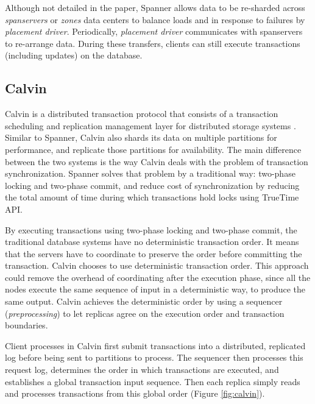 Although not detailed in the paper, Spanner allows data to be re-sharded across
\emph{spanservers} or \emph{zones} data centers to balance loads and in response
to failures by \emph{placement driver}. Periodically, \emph{placement driver}
communicates with spanservers to re-arrange data. During these transfers,
clients can still execute transactions (including updates) on the database.

\subsection{Calvin}

Calvin is a distributed transaction protocol that consists of a transaction
scheduling and replication management layer for distributed storage systems
\cite{calvin}. Similar to Spanner, Calvin also shards its data on multiple
partitions for performance, and replicate those partitions for availability. The
main difference between the two systems is the way Calvin deals with the problem
of transaction synchronization. Spanner solves that problem by a traditional
way: two-phase locking and two-phase commit, and reduce cost of synchronization
by reducing the total amount of time during which transactions hold locks using
TrueTime API.

By executing transactions using two-phase locking and two-phase commit, the
traditional database systems have no deterministic transaction order. It means
that the servers have to coordinate to preserve the order before committing the
transaction. Calvin chooses to use deterministic transaction order. This
approach could remove the overhead of coordinating after the execution phase,
since all the nodes execute the same sequence of input in a deterministic way,
to produce the same output. Calvin achieves the deterministic order by using
a sequencer (\emph{preprocessing}) to let replicas agree on the execution order and
transaction boundaries.

Client processes in Calvin first submit transactions into a distributed,
replicated log before being sent to partitions to process. The sequencer then
processes this request log, determines the order in which transactions are
executed, and establishes a global transaction input sequence. Then each replica
simply reads and processes transactions from this global order (Figure
\ref{fig:calvin}).

